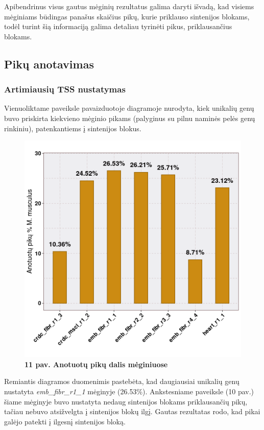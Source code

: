 \documentclass[12pt]{article}
\begin{document}
Apibendrinus visus gautus mėginių rezultatus galima daryti išvadą, kad visiems
mėginiams būdingas panašus skaičius pikų, kurie priklauso sintenijos blokams,
todėl turint šią informaciją galima detaliau tyrinėti pikus, priklausančius
blokams.

\subsection{Pikų anotavimas}
\subsubsection{Artimiausių TSS nustatymas}
Vienuoliktame paveiksle pavaizduotoje diagramoje nurodyta, kiek unikalių genų
buvo priskirta kiekvieno mėginio pikams (palyginus su pilnu naminės pelės genų
rinkiniu), patenkantiems į sintenijos blokus.

\begin{figure}[htb]
    \begin{center}
        \includegraphics[width=0.7\linewidth]{../Figures/Unique_genes_MM.png}
        \vspace{-2\baselineskip}
        \caption*{\small\textbf{11 pav. Anotuotų pikų dalis mėginiuose}}
        \label{fig:11}
    \end{center}
\end{figure}

Remiantis diagramos duomenimis pastebėta, kad daugiausiai unikalių genų
nustatyta \emph{emb\_\-fibr\_r1\_1} mėginyje (26.53\%). Ankstesniame paveiksle
(10 pav.) šiame mėginyje buvo nustatyta nedaug sintenijos blokams priklausančių
pikų, tačiau nebuvo atsižvelgta į sintenijos blokų ilgį. Gautas rezultatas rodo,
kad pikai galėjo patekti į ilgesnį sintenijos bloką.
\end{document}
